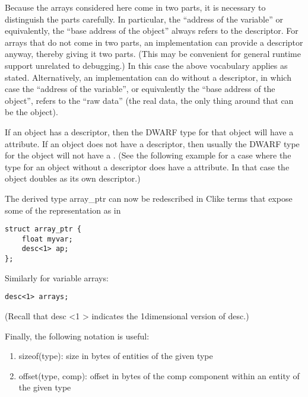 Because the arrays considered here come in two parts, it is
necessary to distinguish the parts carefully. In particular,
the “address of the variable” or equivalently, the “base
address of the object” always refers to the descriptor. For
arrays that do not come in two parts, an implementation can
provide a descriptor anyway, thereby giving it two parts. (This
may be convenient for general runtime support unrelated to
debugging.) In this case the above vocabulary applies as
stated. Alternatively, an implementation can do without a
descriptor, in which case the “address of the variable”,
or equivalently the “base address of the object”, refers
to the “raw data” (the real data, the only thing around
that can be the object).

If an object has a descriptor, then the DWARF type for that
object will have a 
 attribute. If an object
does not have a descriptor, then usually the DWARF type for the
object will not have a 
. 
(See the following
 example for a case where the type for an object without
a descriptor does have a  attribute. In
that case the object doubles as its own descriptor.)

The  derived type array\_ptr can now be redescribed
in C\dash like terms that expose some of the representation as in

\begin{lstlisting}
struct array_ptr {
    float myvar;
    desc<1> ap;
};
\end{lstlisting}

Similarly for variable arrays:
\begin{lstlisting}
desc<1> arrays;
\end{lstlisting}

(Recall that desc \textless 1 \textgreater 
indicates the 1\dash dimensional version of desc.)

Finally, the following notation is useful:

\begin{enumerate}[1.]
\item  sizeof(type): size in bytes of entities of the given type

\item offset(type, comp): offset in bytes of the comp component
within an entity of the given type
\end{enumerate}


